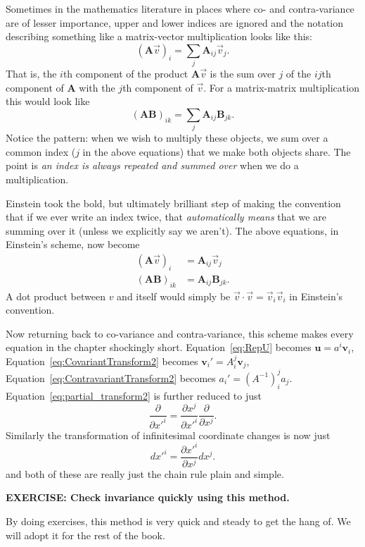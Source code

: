 \documentclass[../master.tex]{subfiles}
\begin{document}
	Sometimes in the mathematics literature in places where co- and contra-variance are of lesser importance, upper and lower indices are ignored and the notation describing something like a matrix-vector multiplication looks like this:
	\begin{equation*}
		(\mathbf A \vec v)_i = \sum_{j} \mathbf A_{ij} \vec v_j.
	\end{equation*}
	That is, the $i$th component of the product $\mathbf A \vec v$ is the sum over $j$ of the $ij$th component of $\mathbf A$ with the $j$th component of $\vec v$. For a matrix-matrix multiplication this would look like
	\begin{equation*}
		(\mathbf A \mathbf{B})_{ik} = \sum_{j} \mathbf A_{ij} \mathbf B_{jk}.
	\end{equation*}
	Notice the pattern: when we wish to multiply these objects, we sum over a common index ($j$ in the above equations) that we make both objects share. The point is \emph{an index is always repeated and summed over} when we do a multiplication. 
	
	Einstein took the bold, but ultimately brilliant step of making the convention that if we ever write an index twice, that \emph{automatically means} that we are summing over it (unless we explicitly say we aren't). The above equations, in Einstein's scheme, now become
	\begin{align*}
		(\mathbf A \vec v)_i & =  \mathbf A_{ij} \vec v_j \\
		(\mathbf A \mathbf{B})_{ik} & = \mathbf A_{ij} \mathbf B_{jk}.
	\end{align*}
	A dot product between $v$ and itself would simply be $\vec v\cdot \vec v = \vec v_i \vec v_i$ in Einstein's convention.
	
	Now returning back to co-variance and contra-variance, this scheme makes every equation in the chapter shockingly short. Equation~\eqref{eq:RepU} becomes $\mathbf u = a^i \mathbf v_i$, Equation~\eqref{eq:CovariantTransform2} becomes $\mathbf v_i' = A^j_i \mathbf v_j$, Equation~\eqref{eq:ContravariantTransform2} becomes $a_i' = (A^{-1})^j_i a_j$. Equation~\eqref{eq:partial_transform2} is further reduced to just 
	\begin{equation*}
		\frac{\partial}{\partial {x'}^i} = \frac{\partial x^j}{\partial {x'}^i} \frac{\partial}{\partial x^j}.
	\end{equation*}
	Similarly the transformation of infinitesimal coordinate changes is now just
	\begin{equation*}
		dx'^i = \frac{\partial {x'}^i}{\partial x^j} dx^j.
	\end{equation*}
	and both of these are really just the chain rule plain and simple.
	
	\textbf{EXERCISE: Check invariance quickly using this method.}

	By doing exercises, this method is very quick and steady to get the hang of. We will adopt it for the rest of the book.
	
	
\end{document}
